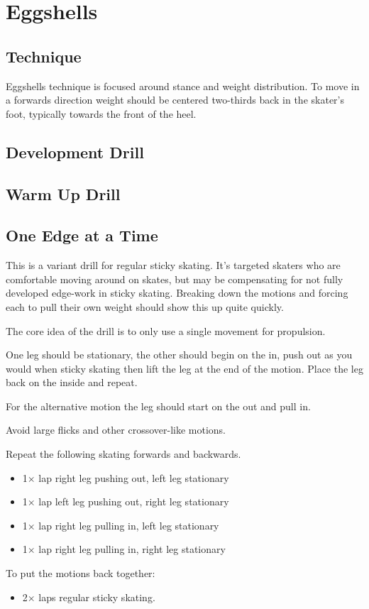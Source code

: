 \section{Eggshells}
\label{sec:sticky/eggshells}

\subsection*{Technique}

Eggshells technique is focused around stance and weight distribution.
To move in a forwards direction weight should be centered two-thirds back in the skater's foot, typically towards the front of the heel. 




\subsection*{Development Drill}

\subsection*{Warm Up Drill}

\subsection*{One Edge at a Time}
\label{drill:sticky/eggshells/one_edge}

This is a variant drill for regular sticky skating. 
It's targeted skaters who are comfortable moving around on skates, but may be compensating for not fully developed edge-work in sticky skating.
Breaking down the motions and forcing each to pull their own weight should show this up quite quickly.

The core idea of the drill is to only use a single movement for propulsion.  

One leg should be stationary, the other should begin on the in, push out as you would when sticky skating then lift the leg at the end of the motion.  
Place the leg back on the inside and repeat. 

For the alternative motion the leg should start on the out and pull in.   

Avoid large flicks and other crossover-like motions.    

Repeat the following skating forwards and backwards. 
\begin{itemize}
    \item 1$\times$ lap right leg pushing out, left leg stationary  
    \item 1$\times$ lap left leg pushing out, right leg stationary 
    \item 1$\times$ lap right leg pulling in, left leg stationary 
    \item 1$\times$ lap right leg pulling in, right leg stationary 
\end{itemize}

To put the motions back together:
\begin{itemize}
    \item 2$\times$ laps regular sticky skating. 
\end{itemize}
